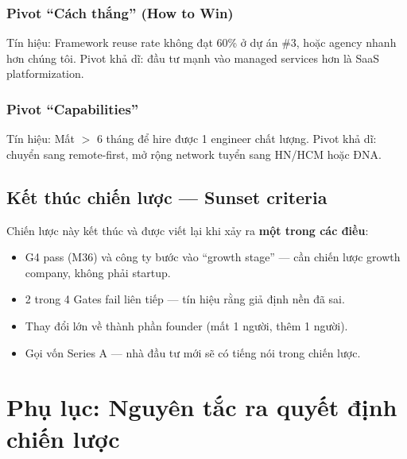 \documentclass[11pt,a4paper]{article}
\begin{document}
\subsubsection*{Pivot ``Cách thắng'' (How to Win)}

Tín hiệu: Framework reuse rate không đạt 60\% ở dự án \#3, hoặc agency nhanh hơn
chúng tôi. Pivot khả dĩ: đầu tư mạnh vào managed services hơn là SaaS
platformization.

\subsubsection*{Pivot ``Capabilities''}

Tín hiệu: Mất $>$ 6 tháng để hire được 1 engineer chất lượng. Pivot khả dĩ:
chuyển sang remote-first, mở rộng network tuyển sang HN/HCM hoặc ĐNA.

\subsection{Kết thúc chiến lược --- Sunset criteria}

Chiến lược này kết thúc và được viết lại khi xảy ra \textbf{một trong các điều}:

\begin{itemize}
\item G4 pass (M36) và công ty bước vào ``growth stage'' --- cần chiến lược growth company, không phải startup.
\item 2 trong 4 Gates fail liên tiếp --- tín hiệu rằng giả định nền đã sai.
\item Thay đổi lớn về thành phần founder (mất 1 người, thêm 1 người).
\item Gọi vốn Series A --- nhà đầu tư mới sẽ có tiếng nói trong chiến lược.
\end{itemize}

\clearpage

\section*{Phụ lục: Nguyên tắc ra quyết định chiến lược}
\end{document}
